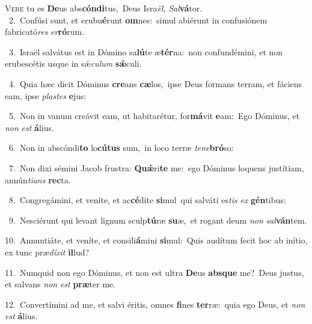 \lettrine{\initial\textcolor{\initialcolor}{V}}{ere} tu es \textbf{De}\-us abs\-\textbf{cón}\-\textbf{di}tus,~\star Deus Isra\-\textit{ël}\-, \textit{Sal}\-\textbf{vá}tor.\\
{\numbfont\textcolor{\numbcolor}{~2.}}~Confúsi sunt, et erubu\-\textbf{é}\-runt \textbf{om}\-nes:~\star simul abiérunt in confusiónem fabricató\textit{res} \textit{er}\-\textbf{ró}rum.\par
{\numbfont\textcolor{\numbcolor}{~3.}}~Israël salvátus est in Dómino sa\-\textbf{lú}\-te æ\-\textbf{tér}\-na:~\star non confundémini, et non erubescétis usque in sǽ\-\textit{cu}\-\textit{lum} \textbf{sǽ}\-culi.\par
{\numbfont\textcolor{\numbcolor}{~4.}}~Quia hæc dicit Dóminus \textbf{cre}\-ans \textbf{cæ}\-los,~\star ipse Deus formans terram, et fáciens eam, ipse \textit{plas}\-\textit{tes} \textbf{e}\-jus:\par
{\numbfont\textcolor{\numbcolor}{~5.}}~Non in vanum creávit eam, ut habitarétur, for\-\textbf{má}\-vit \textbf{e}\-am:~\star Ego Dóminus, et \textit{non} \textit{est} \textbf{á}\-lius.\par
{\numbfont\textcolor{\numbcolor}{~6.}}~Non in abscóndi\textbf{to} lo\-\textbf{cú}\-\textbf{tus} sum,~\star in loco terræ \textit{te}\-\textit{ne}\textbf{bró}so:\par
{\numbfont\textcolor{\numbcolor}{~7.}}~Non dixi sémini Jacob frustra: \textbf{Quǽ}\-ri\textbf{te} me:~\star ego Dóminus loquens justítiam, annún\-\textit{ti}\-\textit{ans} \textbf{rec}\-ta.\par
{\numbfont\textcolor{\numbcolor}{~8.}}~Congregámini, et veníte, et ac\-\textbf{cé}\-dite \textbf{si}\-mul~\star qui salváti es\textit{tis} \textit{ex} \textbf{gén}\-tibus:\par
{\numbfont\textcolor{\numbcolor}{~9.}}~Nesciérunt qui levant lignum sculp\-\textbf{tú}\-ræ \textbf{su}\-æ,~\star et rogant deum \textit{non} \textit{sal}\-\textbf{ván}tem.\par
{\numbfont\textcolor{\numbcolor}{10.}}~Annuntiáte, et veníte, et consili\-\textbf{á}\-mini \textbf{si}\-mul:~\star Quis audítum fecit hoc ab inítio, ex tunc præ\-\textit{dí}\-\textit{xit} \textbf{il}\-lud?\par
{\numbfont\textcolor{\numbcolor}{11.}}~Numquid non ego Dóminus, et non est ultra \textbf{De}\-us \textbf{abs}\-\textbf{que} me?~\star Deus justus, et salvans \textit{non} \textit{est} \textbf{præ}\-ter me.\par
{\numbfont\textcolor{\numbcolor}{12.}}~Convertímini ad me, et salvi éritis, omnes \textbf{fi}\-nes \textbf{ter}\-ræ:~\star quia ego Deus, et \textit{non} \textit{est} \textbf{á}\-lius.\par
